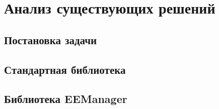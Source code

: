\chapter{Анализ существующих решений}

\section{Постановка задачи}

\section{Стандартная библиотека}

\section{Библиотека EEManager}
